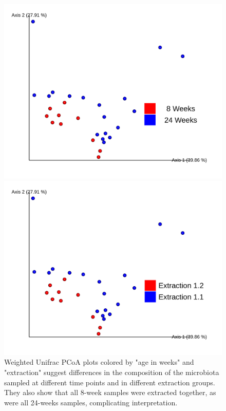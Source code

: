 \documentclass[final]{beamer}
\newlength{\colwidth}
\begin{document}
\begin{frame}[t]
\begin{columns}[t]
\begin{column}{\colwidth}
  \begin{figure}[!htb]
        \begin{center}
          \includegraphics[width=\linewidth]{assets/w_unifrac_age_wk}
        \end{center}
      \endminipage
        \begin{center}
          \includegraphics[width=\linewidth]{assets/w_unifrac_extraction}
        \end{center}
      \endminipage\hfill
      \caption{Weighted Unifrac PCoA plots colored by "age in weeks" and
      "extraction" suggest differences in the composition of the microbiota
      sampled at different time points and in different extraction groups.
      They also show that all 8-week samples were extracted together, as were
      all 24-weeks samples, complicating interpretation.}
      \label{fig:qpcrResults}
    \end{figure}


\end{column}
\end{columns}
\end{frame}
\end{document}
